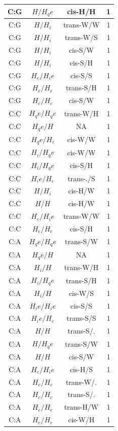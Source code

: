 \begin{center}
\begin{longtable}{c|c|c|c}
C:G & $H/H_qe$ & cis-H/H & 1 \\  \hline
C:G & $H/H_i$ & trans-W/W & 1 \\  \hline
C:G & $H/H_i$ & trans-W/S & 1 \\  \hline
C:G & $H/H_i$ & cis-S/W & 1 \\  \hline
C:G & $H/H_i$ & cis-S/H & 1 \\  \hline
C:G & $H_e/H_ie$ & cis-S/S & 1 \\  \hline
C:G & $H_e/H_e$ & trans-S/H & 1 \\  \hline
C:G & $H_e/H_e$ & cis-S/W & 1 \\  \hline
C:C & $H_qe/H_qe$ & trans-W/H & 1 \\  \hline
C:C & $H_qe/H$ & NA & 1 \\  \hline
C:C & $H_qe/H_i$ & cis-W/W & 1 \\  \hline
C:C & $H_i/H_qe$ & cis-W/W & 1 \\  \hline
C:C & $H_i/H_qe$ & cis-S/H & 1 \\  \hline
C:C & $H_ie/H_e$ & trans-./S & 1 \\  \hline
C:C & $H/H_i$ & cis-H/W & 1 \\  \hline
C:C & $H/H$ & cis-H/W & 1 \\  \hline
C:C & $H_e/H_ie$ & trans-W/W & 1 \\  \hline
C:C & $H_e/H_e$ & cis-S/H & 1 \\  \hline
C:A & $H_qe/H_qe$ & trans-S/W & 1 \\  \hline
C:A & $H_qe/H$ & NA & 1 \\  \hline
C:A & $H_i/H$ & trans-W/H & 1 \\  \hline
C:A & $H_i/H_qe$ & trans-S/H & 1 \\  \hline
C:A & $H_i/H$ & cis-W/S & 1 \\  \hline
C:A & $H_ie/H_ie$ & cis-S/S & 1 \\  \hline
C:A & $H_ie/H_e$ & trans-S/S & 1 \\  \hline
C:A & $H/H$ & trans-S/. & 1 \\  \hline
C:A & $H/H_qe$ & trans-S/W & 1 \\  \hline
C:A & $H/H$ & cis-S/W & 1 \\  \hline
C:A & $H_e/H_ie$ & cis-H/S & 1 \\  \hline
C:A & $H_e/H_e$ & trans-W/. & 1 \\  \hline
C:A & $H_e/H_e$ & trans-S/. & 1 \\  \hline
C:A & $H_e/H_e$ & trans-H/W & 1 \\  \hline
C:A & $H_e/H_e$ & cis-W/H & 1 \\  \hline

\end{longtable}
\end{center}
